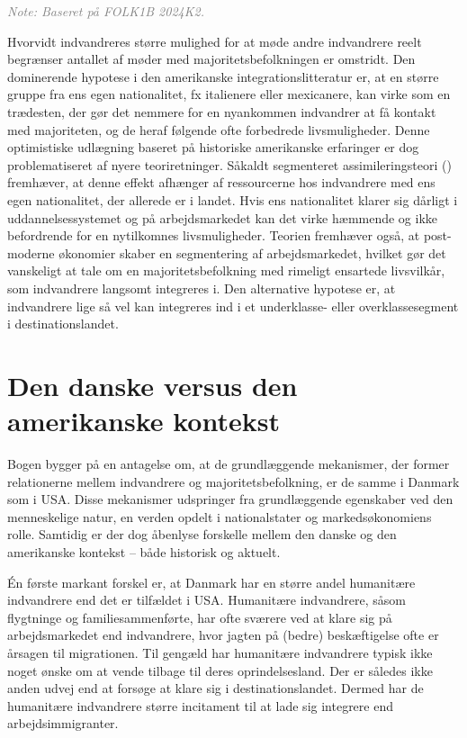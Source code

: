 \documentclass[
]{book}
\begin{document}
\begin{footnotesize}\textit{\textcolor{gray}{
Note: Baseret på FOLK1B 2024K2.
}}
\end{footnotesize}

Hvorvidt indvandreres større mulighed for at møde andre indvandrere reelt begrænser antallet af møder med majoritetsbefolkningen er omstridt. Den dominerende hypotese i den amerikanske integrationslitteratur er, at en større gruppe fra ens egen nationalitet, fx italienere eller mexicanere, kan virke som en trædesten, der gør det nemmere for en nyankommen indvandrer at få kontakt med majoriteten, og de heraf følgende ofte forbedrede livsmuligheder. Denne optimistiske udlægning baseret på historiske amerikanske erfaringer er dog problematiseret af nyere teoriretninger. Såkaldt segmenteret assimileringsteori () fremhæver, at denne effekt afhænger af ressourcerne hos indvandrere med ens egen nationalitet, der allerede er i landet. Hvis ens nationalitet klarer sig dårligt i uddannelsessystemet og på arbejdsmarkedet kan det virke hæmmende og ikke befordrende for en nytilkomnes livsmuligheder. Teorien fremhæver også, at post-moderne økonomier skaber en segmentering af arbejdsmarkedet, hvilket gør det vanskeligt at tale om en majoritetsbefolkning med rimeligt ensartede livsvilkår, som indvandrere langsomt integreres i. Den alternative hypotese er, at indvandrere lige så vel kan integreres ind i et underklasse- eller overklassesegment i destinationslandet.

\section{Den danske versus den amerikanske kontekst}\label{den-danske-versus-den-amerikanske-kontekst}

Bogen bygger på en antagelse om, at de grundlæggende mekanismer, der former relationerne mellem indvandrere og majoritetsbefolkning, er de samme i Danmark som i USA. Disse mekanismer udspringer fra grundlæggende egenskaber ved den menneskelige natur, en verden opdelt i nationalstater og markedsøkonomiens rolle. Samtidig er der dog åbenlyse forskelle mellem den danske og den amerikanske kontekst -- både historisk og aktuelt.

Én første markant forskel er, at Danmark har en større andel humanitære indvandrere end det er tilfældet i USA. Humanitære indvandrere, såsom flygtninge og familiesammenførte, har ofte sværere ved at klare sig på arbejdsmarkedet end indvandrere, hvor jagten på (bedre) beskæftigelse ofte er årsagen til migrationen. Til gengæld har humanitære indvandrere typisk ikke noget ønske om at vende tilbage til deres oprindelsesland. Der er således ikke anden udvej end at forsøge at klare sig i destinationslandet. Dermed har de humanitære indvandrere større incitament til at lade sig integrere end arbejdsimmigranter.
\end{document}
